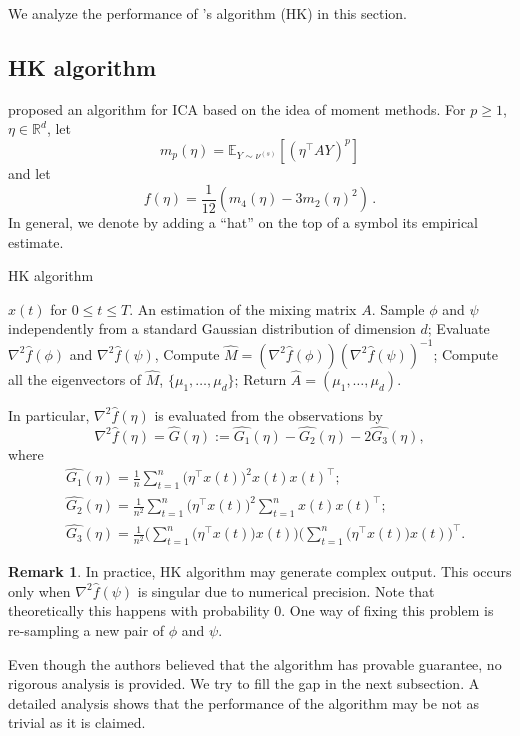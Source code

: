 \documentclass[twoside]{article}
\newcommand{\E}{\mathbb{E}}
\newcommand{\real}{\mathbb{R}}
\theoremstyle{definition}
\newtheorem{remark}[lemma]{Remark}
\begin{document}
We analyze the performance of \citet{hsu2013learning}'s algorithm (HK) in this section.

\subsection{HK algorithm}
\label{subsec:HKalg}
\citet{DHsu2012} proposed an algorithm for ICA based on the idea of moment methods.
For $p\ge 1$, $\eta\in \real^d$, 
let 
\begin{equation}
\label{eq:momnent}
m_p(\eta) = \E_{Y\sim \nu^{(s)}}[ (\eta^\top A Y)^p ]
\end{equation}
and let
\begin{equation}
\label{eq:funcf}
f(\eta) = \frac1{12} \left( m_4(\eta) - 3 m_2(\eta)^2 \right)\,.
\end{equation}
In general, we denote by adding a ``hat'' on the top of a symbol its empirical estimate.
\begin{algorithm}[H]
\caption{HK algorithm}
\begin{algorithmic}[1]
\INPUT $x(t)$ for $0\le t \le T$. 
\OUTPUT An estimation of the mixing matrix $A$. 
\STATE Sample $\phi$ and $\psi$ independently from a standard Gaussian distribution of dimension $d$;
\STATE Evaluate $\nabla^2\widehat{f}(\phi)$ and $\nabla^2\widehat{f}(\psi)$, 
\STATE Compute $\widehat{M} = (\nabla^2 \widehat{f}(\phi))(\nabla^2\widehat{f}(\psi))^{-1}$;
\STATE Compute all the eigenvectors of $\widehat{M}$, $\{\mu_1,\ldots,\mu_d\}$;
\STATE Return $\widehat{A} = (\mu_1,\ldots,\mu_d)$.
\end{algorithmic}
\end{algorithm}
In particular, $\nabla^2\widehat{f}(\eta)$  is evaluated from the observations by
\begin{equation}
\label{eq:G}
\nabla^2 \widehat{f}(\eta) = \widehat{G}(\eta):= \widehat{G_1}(\eta) - \widehat{G_2}(\eta) -2\widehat{G_3}(\eta),
\end{equation}
where 
\begin{align*}
&\widehat{ G_1}(\eta) = \frac1n\sum_{t=1}^{n} \big(\eta^{\top}x(t)\big)^2x(t)x(t)^{\top}; \\
& \widehat{G_2}(\eta) = \frac{1}{n^2}\sum_{t=1}^{n} \big(\eta^{\top}x(t)\big)^2 \sum_{t=1}^{n}x(t)x(t)^{\top}; \\
& \widehat{G_3}(\eta) = \frac{1}{n^2}\Big(\sum_{t=1}^{n} \big(\eta^{\top}x(t)\big)x(t)\Big) \Big(\sum_{t=1}^{n} \big(\eta^{\top}x(t)\big)x(t)\Big)^{\top}.
\end{align*} 
\begin{remark}
In practice, HK algorithm may generate complex output. 
This occurs only when $\nabla^2\widehat{f}(\psi)$ is singular due to numerical precision. 
Note that theoretically this happens with probability 0. 
One way of fixing this problem is re-sampling a new pair of $\phi$ and $\psi$.
\end{remark}
Even though the authors believed that the algorithm has provable guarantee, no rigorous analysis is provided. 
We try to fill the gap in the next subsection. 
A detailed analysis shows that the performance of the algorithm may be not as trivial as it is claimed.
\end{document}
